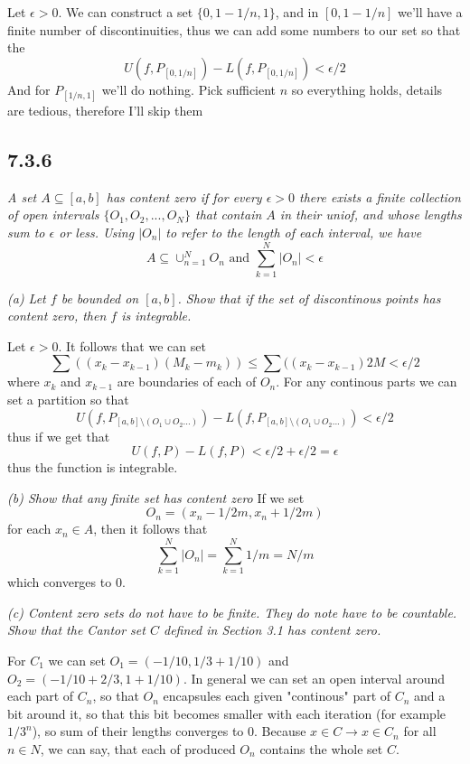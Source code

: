 \documentclass[11pt,oneside,titlepage]{book}
\begin{document}
Let $\epsilon > 0$.
We can construct a set $\{0, 1 - 1/n, 1\}$, and in
$[0, 1 - 1/n]$ we'll have a finite number of discontinuities, thus
we can add some numbers to our set so that  the
$$U(f, P_{[0, 1/n]}) - L(f, P_{[0, 1/n]}) < \epsilon/2$$
And for $P_{[1/n, 1]}$ we'll do nothing. Pick sufficient $n$ so everything
holds, details are tedious, therefore I'll skip them

\subsection*{7.3.6}
\textit{A set $A \subseteq [a, b]$ has content zero if for every $\epsilon > 0$
  there exists a finite collection of open intervals
  $\{O_1, O_2, ..., O_N\}$ that contain $A$ in their uniof, and whose lengths
  sum to $\epsilon$ or less. Using $|O_n|$ to refer to the length of
  each interval, we have }
$$A \subseteq \cup_{n = 1}^N{O_n} \text{ and }
\sum_{k = 1}^N{|O_n|} < \epsilon$$

\textit{(a) Let $f$ be bounded on $[a, b]$. Show that if the set of
  discontinous points has content zero, then $f$ is integrable.}

Let $\epsilon > 0$. It follows that we can set
$$\sum{((x_k - x_{k - 1})(M_k - m_k)) } \leq
\sum{((x_k - x_{k - 1})2M} < \epsilon/2$$
where $x_k$ and $x_{k - 1}$ are boundaries of each of $O_n$.
For any continous parts we can set a partition so that
$$U(f, P_{[a, b] \setminus (O_1 \cup O_2 ... )}) -
L(f, P_{[a, b] \setminus (O_1 \cup O_2 ... )}) < \epsilon/2$$
thus if we get that
$$U(f, P) - L(f, P) < \epsilon/2 + \epsilon/2 = \epsilon$$
thus the function is integrable.

\textit{(b) Show that any finite set has content zero}
If we set
$$O_n = (x_n - 1/2m, x_n + 1/2m)$$
for each $x_n \in A$, then it follows that
$$\sum_{k = 1}^N{|O_n|} = \sum_{k = 1}^N{1/m} = N/m$$
which converges to $0$.

\textit{(c) Content zero sets do not have to be finite. They do note have to
  be countable. Show that the Cantor set $C$ defined in Section 3.1 has
  content zero.}

For $C_1$ we can set $O_1 = (-1/10, 1/3 + 1/10)$ and
$O_2 = (-1/10 + 2/3, 1 + 1/10)$. In general we can set an open interval
around each part of $C_n$, so that $O_n$ encapsules each given "continous"
part of $C_n$ and a bit around it, so that this bit becomes smaller with
each iteration (for example $1/3^n$), so
sum of their lengths converges to 0. Because $x \in C \to x \in C_n$ for
all $n \in N$, we can say, that each of produced $O_n$ contains the whole
set $C$.
\end{document}
